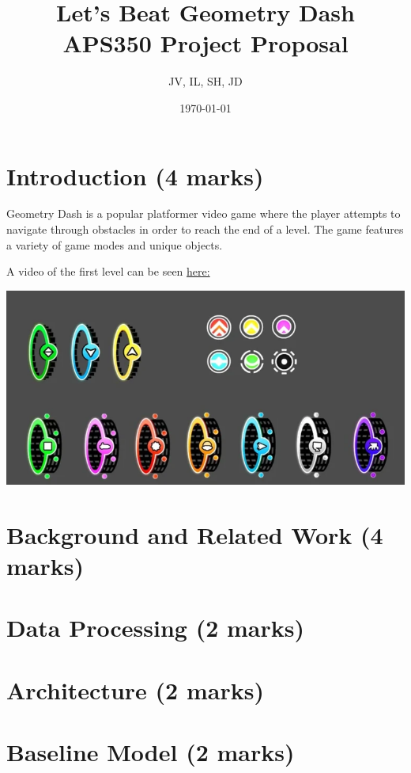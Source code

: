 \documentclass{article}
\title{%
  Let's Beat Geometry Dash \\
  \large APS350 Project Proposal
  }
\author{JV, IL, SH, JD}
\date{\today}
\begin{document}
\maketitle

\pagebreak
\section{Introduction (4 marks)}
Geometry Dash is a popular platformer video game 
where the player attempts to navigate through 
obstacles in order to reach the end of a level. 
The game features a variety of game modes and 
unique objects.

A video of the first level can be seen \href{https://www.youtube.com/watch?v=bbVEbqU9wPo}{here:} 

\begin{center} 
\includegraphics[scale=0.5]{Images/GeoObj.png}
\end{center}




\section{Background and Related Work (4 marks)}

\section{Data Processing (2 marks)}

\section{Architecture (2 marks)}

\section{Baseline Model (2 marks)}
\end{document}
